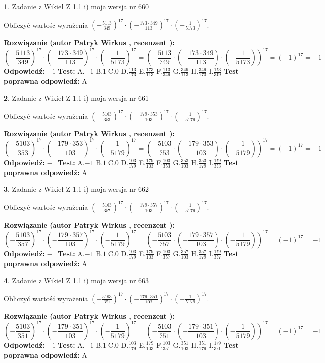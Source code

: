 \documentclass[12pt, a4paper]{article}
\theoremstyle{definition} %
\newtheorem{zad}{}
\newcommand{\zadStart}[1]{\begin{zad}#1\newline}
\newcommand{\zadStop}{\end{zad}}
\newcommand{\rozwStart}[2]{\noindent \textbf{Rozwiązanie (autor #1 , recenzent #2): }\newline}
\newcommand{\rozwStop}{\newline}
\newcommand{\odpStart}{\noindent \textbf{Odpowiedź:}\newline}
\newcommand{\odpStop}{\newline}
\newcommand{\testStart}{\noindent \textbf{Test:}\newline}
\newcommand{\testStop}{\newline}
\newcommand{\kluczStart}{\noindent \textbf{Test poprawna odpowiedź:}\newline}
\newcommand{\kluczStop}{\newline}
\begin{document}
\zadStart{Zadanie z Wikieł Z 1.1 i) moja wersja nr 660}

Obliczyć wartość wyrażenia $(-\frac{5113}{349})^{17} \cdot (-\frac{173 \cdot 349}{113})^{17} \cdot (-\frac{1}{5173})^{17}$.
\zadStop
\rozwStart{Patryk Wirkus}{}
$$(-\frac{5113}{349})^{17} \cdot (-\frac{173 \cdot 349}{113})^{17} \cdot (-\frac{1}{5173})^{17} = (-\frac{5113}{349} \cdot (-\frac{173 \cdot 349}{113}) \cdot (-\frac{1}{5173}))^{17} = (-1)^{17} = -1$$
\rozwStop
\odpStart
$-1$
\odpStop
\testStart
A.$-1$ B.$1$ C.$0$ D.$\frac{113}{173}$ E.$\frac{173}{113}$
F.$\frac{113}{349}$ G.$\frac{349}{113}$
H.$\frac{349}{173}$
I.$\frac{173}{349}$
\testStop
\kluczStart
A
\kluczStop



\zadStart{Zadanie z Wikieł Z 1.1 i) moja wersja nr 661}

Obliczyć wartość wyrażenia $(-\frac{5103}{353})^{17} \cdot (-\frac{179 \cdot 353}{103})^{17} \cdot (-\frac{1}{5179})^{17}$.
\zadStop
\rozwStart{Patryk Wirkus}{}
$$(-\frac{5103}{353})^{17} \cdot (-\frac{179 \cdot 353}{103})^{17} \cdot (-\frac{1}{5179})^{17} = (-\frac{5103}{353} \cdot (-\frac{179 \cdot 353}{103}) \cdot (-\frac{1}{5179}))^{17} = (-1)^{17} = -1$$
\rozwStop
\odpStart
$-1$
\odpStop
\testStart
A.$-1$ B.$1$ C.$0$ D.$\frac{103}{179}$ E.$\frac{179}{103}$
F.$\frac{103}{353}$ G.$\frac{353}{103}$
H.$\frac{353}{179}$
I.$\frac{179}{353}$
\testStop
\kluczStart
A
\kluczStop



\zadStart{Zadanie z Wikieł Z 1.1 i) moja wersja nr 662}

Obliczyć wartość wyrażenia $(-\frac{5103}{357})^{17} \cdot (-\frac{179 \cdot 357}{103})^{17} \cdot (-\frac{1}{5179})^{17}$.
\zadStop
\rozwStart{Patryk Wirkus}{}
$$(-\frac{5103}{357})^{17} \cdot (-\frac{179 \cdot 357}{103})^{17} \cdot (-\frac{1}{5179})^{17} = (-\frac{5103}{357} \cdot (-\frac{179 \cdot 357}{103}) \cdot (-\frac{1}{5179}))^{17} = (-1)^{17} = -1$$
\rozwStop
\odpStart
$-1$
\odpStop
\testStart
A.$-1$ B.$1$ C.$0$ D.$\frac{103}{179}$ E.$\frac{179}{103}$
F.$\frac{103}{357}$ G.$\frac{357}{103}$
H.$\frac{357}{179}$
I.$\frac{179}{357}$
\testStop
\kluczStart
A
\kluczStop



\zadStart{Zadanie z Wikieł Z 1.1 i) moja wersja nr 663}

Obliczyć wartość wyrażenia $(-\frac{5103}{351})^{17} \cdot (-\frac{179 \cdot 351}{103})^{17} \cdot (-\frac{1}{5179})^{17}$.
\zadStop
\rozwStart{Patryk Wirkus}{}
$$(-\frac{5103}{351})^{17} \cdot (-\frac{179 \cdot 351}{103})^{17} \cdot (-\frac{1}{5179})^{17} = (-\frac{5103}{351} \cdot (-\frac{179 \cdot 351}{103}) \cdot (-\frac{1}{5179}))^{17} = (-1)^{17} = -1$$
\rozwStop
\odpStart
$-1$
\odpStop
\testStart
A.$-1$ B.$1$ C.$0$ D.$\frac{103}{179}$ E.$\frac{179}{103}$
F.$\frac{103}{351}$ G.$\frac{351}{103}$
H.$\frac{351}{179}$
I.$\frac{179}{351}$
\testStop
\kluczStart
A
\kluczStop
\end{document}
